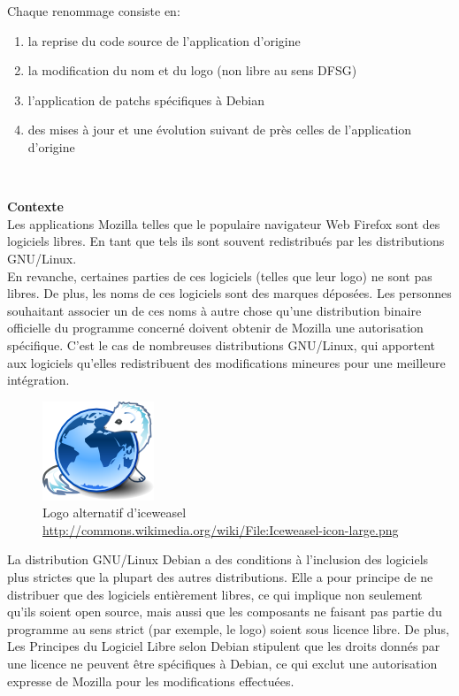 \documentclass[a4paper]{article}
\begin{document}
			Chaque renommage consiste en:
			\begin{enumerate}
				\item la reprise du code source de l'application d'origine
				\item la modification du nom et du logo (non libre au sens DFSG)
				\item l'application de patchs spécifiques à Debian
				\item des mises à jour et une évolution suivant de près celles de l'application d'origine
			\end{enumerate} ~

			\noindent \textbf{Contexte} \\

			Les applications Mozilla telles que le populaire navigateur Web Firefox sont des logiciels libres. En tant que tels ils sont souvent redistribués par les distributions GNU/Linux. \\

			En revanche, certaines parties de ces logiciels (telles que leur logo) ne sont pas libres. De plus, les noms de ces logiciels sont des marques déposées. Les personnes souhaitant associer un de ces noms à autre chose qu'une distribution binaire officielle du programme concerné doivent obtenir de Mozilla une autorisation spécifique. C'est le cas de nombreuses distributions GNU/Linux, qui apportent aux logiciels qu'elles redistribuent des modifications mineures pour une meilleure intégration. \\

			\begin{figure}
				\centering
				\includegraphics[scale=0.5]{img/iceweasel.png}
				\caption{Logo alternatif d'iceweasel \url{http://commons.wikimedia.org/wiki/File:Iceweasel-icon-large.png}}
			\end{figure}

			La distribution GNU/Linux Debian a des conditions à l'inclusion des logiciels plus strictes que la plupart des autres distributions. Elle a pour principe de ne distribuer que des logiciels entièrement libres, ce qui implique non seulement qu'ils soient open source, mais aussi que les composants ne faisant pas partie du programme au sens strict (par exemple, le logo) soient sous licence libre. De plus, Les Principes du Logiciel Libre selon Debian stipulent que les droits donnés par une licence ne peuvent être spécifiques à Debian, ce qui exclut une autorisation expresse de Mozilla pour les modifications effectuées. \\
\end{document}
